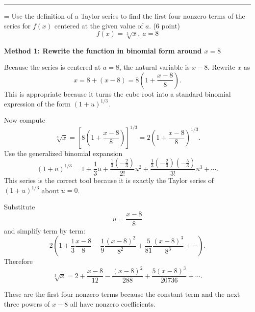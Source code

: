 \documentclass[a4paper,12pt,twocolumn]{article}
\newlength{\problemnumberwidth}
\newenvironment{solutionbox}{\begin{framed}}{\end{framed}}
\newcommand{\sectiontitle}[2]{%
  \hypertarget{#1}{}%
  \par\vspace{0.8em}%
  \noindent{\Large\bfseries #2}\par
  \vspace{0.3em}%
  \hrule
  \vspace{0.8em}%
}
\newcommand{\problem}[3]{%
  \Needspace{10\baselineskip}%
  \phantomsection\label{#1}%
  \par\vspace{0.8em}%
  \noindent
  \hangindent=\problemnumberwidth
  \hangafter=1
  \makebox[\problemnumberwidth][l]{\textbf{#2.}}#3\par
}
\begin{document}
\sectiontitle{sec:11-10}{11-10}

\problem{prob:11-10-1}{1}{Use the definition of a Taylor series to find the first four nonzero terms of the series for \(f(x)\) centered at the given value of \(a\). (6 point)
\[
f(x)=\sqrt[3]{x},\ a=8
\]}

\begin{solutionbox}
\textbf{Method 1: Rewrite the function in binomial form around \(x=8\)}

\begin{steps}
\item Because the series is centered at \(a=8\), the natural variable is \(x-8\). Rewrite \(x\) as
\[
x=8+(x-8)=8\left(1+\frac{x-8}{8}\right).
\]
This is appropriate because it turns the cube root into a standard binomial expression of the form \((1+u)^{1/3}\).

\item Now compute
\[
\sqrt[3]{x}
=\left[8\left(1+\frac{x-8}{8}\right)\right]^{1/3}
=2\left(1+\frac{x-8}{8}\right)^{1/3}.
\]
Use the generalized binomial expansion
\[
(1+u)^{1/3}
=1+\frac13u+\frac{\frac13\left(-\frac23\right)}{2!}u^2
+\frac{\frac13\left(-\frac23\right)\left(-\frac53\right)}{3!}u^3+\cdots.
\]
This series is the correct tool because it is exactly the Taylor series of \((1+u)^{1/3}\) about \(u=0\).

\item Substitute
\[
u=\frac{x-8}{8}
\]
and simplify term by term:
\[
2\left(1+\frac13\frac{x-8}{8}-\frac19\frac{(x-8)^2}{8^2}
+\frac{5}{81}\frac{(x-8)^3}{8^3}+\cdots\right).
\]
Therefore
\[
\sqrt[3]{x}
=2+\frac{x-8}{12}-\frac{(x-8)^2}{288}+\frac{5(x-8)^3}{20736}+\cdots.
\]

\item These are the first four nonzero terms because the constant term and the next three powers of \(x-8\) all have nonzero coefficients.
\end{steps}
\end{solutionbox}
\end{document}
